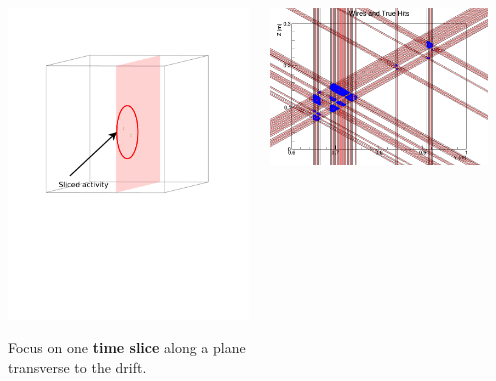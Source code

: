 \documentclass[xcolor=dvipsnames]{beamer}
\begin{document}
\begin{frame}[fragile]
\begin{columns}
\begin{column}{0.35\textwidth}
\begin{center}
        \includegraphics[width=\textwidth,trim=0cm 10cm 0cm 0cm,clip]{slice-3D.pdf}

        \scriptsize Focus on one \textbf{time slice} along a plane transverse to the drift.
      \end{center}
    \end{column}
    \begin{column}{0.65\textwidth}

      \includegraphics[width=0.9\textwidth]{wires-and-true-hits.png}


\end{column}
\end{columns}
\end{frame}
\end{document}
